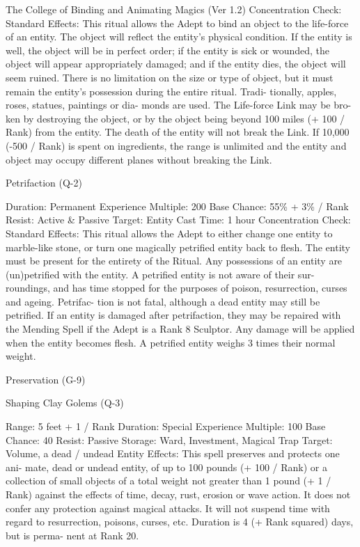 \begin{Chapter}{The College of Binding and Animating Magics (Ver 1.2)}
Concentration Check: Standard 
Effects:  This  ritual  allows  the  Adept  to  bind  an 
object to the life-force of an entity. The object will 
reflect  the  entity’s  physical  condition.  If  the  entity 
is  well,  the  object  will  be  in  perfect  order;  if  the 
entity  is  sick  or  wounded,  the  object  will  appear 
appropriately  damaged;  and  if  the  entity  dies,  the 
object  will  seem  ruined.  There  is  no  limitation  on 
the  size  or  type  of  object,  but  it  must  remain  the 
entity’s  possession  during  the  entire  ritual.  Tradi-
tionally,  apples,  roses,  statues,  paintings  or  dia-
monds  are  used.  The  Life-force  Link  may  be  bro-
ken by destroying the object, or by the object being 
beyond  100  miles  (+  100  /  Rank)  from  the  entity. 
The  death  of  the  entity  will  not  break  the  Link.  If 
10,000  (-500  /  Rank)  is  spent  on  ingredients,  the 
range  is  unlimited  and  the  entity  and  object  may 
occupy different planes without breaking the Link. 

Petrifaction (Q-2) 

Duration: Permanent 
Experience Multiple: 200 
Base Chance: 55\% + 3\% / Rank 
Resist: Active \& Passive 
Target: Entity 
Cast Time: 1 hour 
Concentration Check: Standard 
Effects:  This  ritual  allows  the  Adept  to  either 
change one entity to marble-like stone, or turn one 
magically  petrified  entity  back to  flesh.  The  entity 
must be present for the entirety of the Ritual. Any 
possessions  of  an  entity  are  (un)petrified  with  the 
entity.  A  petrified  entity  is  not  aware  of  their  sur-
roundings,  and  has  time  stopped  for  the  purposes 
of poison, resurrection, curses and ageing. Petrifac-
tion is not fatal, although a dead entity may still be 
petrified. If an entity is damaged after petrifaction, 
they may be repaired with the Mending Spell if the 
Adept  is  a  Rank  8  Sculptor.  Any  damage  will  be 
applied when the entity becomes flesh. A petrified 
entity weighs 3 times their normal weight. 

Preservation (G-9) 

Shaping Clay Golems (Q-3) 

Range: 5 feet + 1 / Rank 
Duration: Special 
Experience Multiple: 100 
Base Chance: 40%
Resist: Passive 
Storage: Ward, Investment, Magical Trap 
Target: Volume, a dead / undead Entity 
Effects:  This  spell  preserves  and  protects  one  ani-
mate,  dead  or  undead  entity,  of  up  to  100  pounds 
(+ 100 / Rank) or a collection of small objects of a 
total weight not greater than 1 pound (+ 1 / Rank) 
against  the  effects  of  time,  decay,  rust,  erosion  or 
wave  action.  It  does  not  confer  any  protection 
against  magical  attacks.  It  will  not  suspend  time 
with  regard  to  resurrection,  poisons,  curses,  etc. 
Duration is 4 (+ Rank squared) days, but is perma-
nent at Rank 20. 


\end{Chapter}
